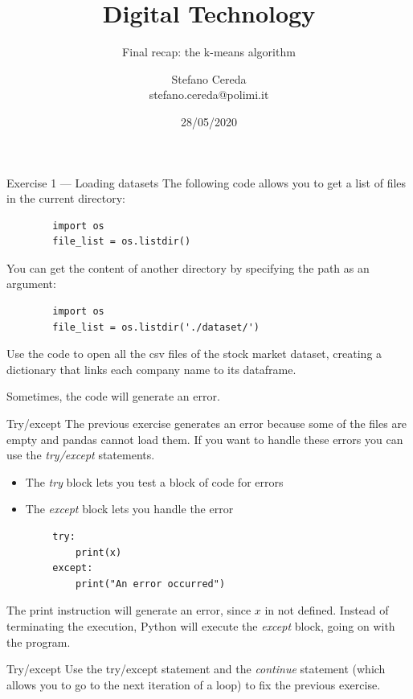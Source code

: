 \documentclass[aspectratio=169,]{beamer}
\title{Digital Technology}
\subtitle{Final recap: the k-means algorithm}
\author{Stefano Cereda\\
stefano.cereda@polimi.it
}
\date{28/05/2020}
\institute[PoliMi]{Politecnico Milano}
\begin{document}
\begin{frame}
    \maketitle
\end{frame}

\begin{frame}[fragile]{Exercise 1 --- Loading datasets}
    The following code allows you to get a list of files in the current directory:
    \begin{verbatim}
        import os
        file_list = os.listdir()
    \end{verbatim}

    You can get the content of another directory by specifying the path as an argument:
    \begin{verbatim}
        import os
        file_list = os.listdir('./dataset/')
    \end{verbatim}

    Use the code to open all the csv files of the stock market dataset, creating a dictionary that links each company
    name to its dataframe.

    \pause
    Sometimes, the code will generate an error.
\end{frame}

\begin{frame}[fragile]{Try/except}
    The previous exercise generates an error because some of the files are empty and pandas cannot load them.
    If you want to handle these errors you can use the \emph{try/except} statements.

    \begin{itemize}
        \item The \emph{try} block lets you test a block of code for errors
        \item The \emph{except} block lets you handle the error
    \end{itemize}

    \begin{verbatim}
        try:
            print(x)
        except:
            print("An error occurred")
    \end{verbatim}
    The print instruction will generate an error, since $x$ in not defined. Instead of terminating the execution, Python
    will execute the \emph{except} block, going on with the program.
\end{frame}

\begin{frame}{Try/except}
    Use the try/except statement and the \emph{continue} statement (which allows you to go to the next iteration of a loop) to fix
    the previous exercise.
\end{frame}
\end{document}
